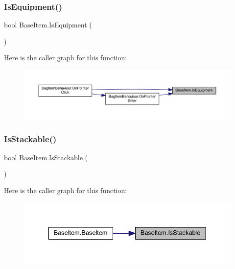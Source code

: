 \subsubsection{\texorpdfstring{IsEquipment()}{IsEquipment()}}
{\footnotesize\ttfamily bool Base\+Item.\+Is\+Equipment (\begin{DoxyParamCaption}{ }\end{DoxyParamCaption})}

Here is the caller graph for this function\+:\nopagebreak
\begin{figure}[H]
\begin{center}
\leavevmode
\includegraphics[width=350pt]{class_base_item_a251c4cb0509ed9191a07057f8ea388c6_icgraph}
\end{center}
\end{figure}
\mbox{\label{class_base_item_ad59a505bcfb8a026519ca912d0c1d8d3}} 
\subsubsection{\texorpdfstring{IsStackable()}{IsStackable()}}
{\footnotesize\ttfamily bool Base\+Item.\+Is\+Stackable (\begin{DoxyParamCaption}{ }\end{DoxyParamCaption})}

Here is the caller graph for this function\+:\nopagebreak
\begin{figure}[H]
\begin{center}
\leavevmode
\includegraphics[width=330pt]{class_base_item_ad59a505bcfb8a026519ca912d0c1d8d3_icgraph}
\end{center}
\end{figure}
\mbox{\label{class_base_item_abedb8e41aaa0f3ee702ae8fa678204e2}} 
